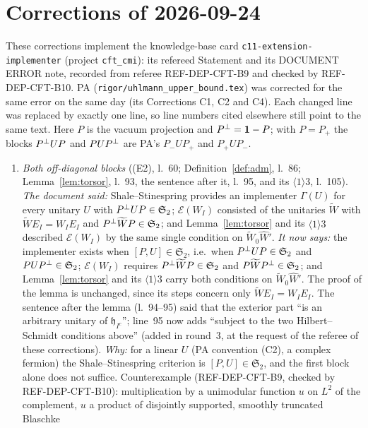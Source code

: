 \documentclass[11pt]{article}
\newcommand{\Wt}{\widetilde W}\newcommand{\kt}{\widetilde k}\newcommand{\Om}{\Omega}\newcommand{\Gm}{\Gamma}
\newcommand{\Stwo}{\mathfrak S_2}\newcommand{\Sone}{\mathfrak S_1}
\begin{document}
\section{Corrections of 2026-09-24}\label{corr0924:sec}
\sloppy
These corrections implement the knowledge-base card \texttt{c11-extension-implementer} (project
\texttt{cft\_cmi}): its refereed Statement and its DOCUMENT ERROR note, recorded from referee
REF-DEP-CFT-B9 and checked by REF-DEP-CFT-B10.  PA (\texttt{rigor/uhlmann\_upper\_bound.tex}) was
corrected for the same error on the same day (its Corrections C1, C2 and C4).  Each changed line
was replaced by exactly one line, so line numbers cited elsewhere still point to the same text.
Here $P$ is the vacuum projection and $P^{\perp}=\mathbf 1-P$; with $P=P_+$ the blocks $P^{\perp} UP$ and
$PUP^{\perp}$ are PA's $P_-UP_+$ and $P_+UP_-$.
\begin{enumerate}[label=\textbf{C\arabic*},ref=C\arabic*,leftmargin=2.6em,itemsep=2pt]
\item\label{corr0924:C1} \emph{Both off-diagonal blocks} ((E2), l.~60;
 Definition~\ref{def:adm}, l.~86; Lemma~\ref{lem:torsor}, l.~93, the sentence after it, l.~95, and its $\langle1\rangle3$,
 l.~105).
 \emph{The document said:} Shale--Stinespring provides an implementer $\Gm(U)$ for every unitary
 $U$ with $\Pperp UP\in\Stwo$; $\mathcal E(W_I)$ consisted of the unitaries $\Wt$ with
 $\Wt E_I=W_IE_I$ and $\Pperp\Wt P\in\Stwo$; and Lemma~\ref{lem:torsor} and its
 $\langle1\rangle3$ described $\mathcal E(W_I)$ by the same single condition on $\Wt_0\widehat W'$.
 \emph{It now says:} the implementer exists when $[P,U]\in\Stwo$, i.e.\ when $\Pperp UP\in\Stwo$
 and $PU\Pperp\in\Stwo$; $\mathcal E(W_I)$ requires $\Pperp\Wt P\in\Stwo$ and $P\Wt\Pperp\in\Stwo$;
 and Lemma~\ref{lem:torsor} and its $\langle1\rangle3$ carry both conditions on $\Wt_0\widehat W'$.
 The proof of the lemma is unchanged, since its steps concern only $\Wt E_I=W_IE_I$.  The sentence
 after the lemma (l.~94--95) said that the exterior part ``is an arbitrary unitary of
 $\mathfrak h_{I^c}$''; line~95 now adds ``subject to the two Hilbert--Schmidt conditions above''
 (added in round~3, at the request of the referee of these corrections).
 \emph{Why:} for a linear $U$ (PA convention (C2), a complex fermion) the Shale--Stinespring
 criterion is $[P,U]\in\Stwo$, and the first block alone does not suffice.  Counterexample
 (REF-DEP-CFT-B9, checked by REF-DEP-CFT-B10): multiplication by a unimodular function $u$ on
 $L^2$ of the complement, $u$ a product of disjointly supported, smoothly truncated Blaschke

\end{enumerate}
\end{document}
